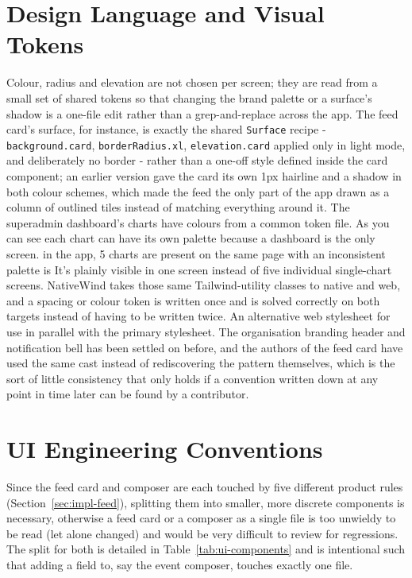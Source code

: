 \section{Design Language and Visual Tokens}
\label{sec:impl-design-tokens}
Colour, radius and elevation are not chosen per screen; they are read from a small set of shared tokens so that changing the brand palette or a surface's shadow is a one-file edit rather than a grep-and-replace across the app. The feed card's surface, for instance, is exactly the shared \texttt{Surface} recipe - \texttt{background.card}, \texttt{borderRadius.xl}, \texttt{elevation.card} applied only in light mode, and deliberately no border - rather than a one-off style defined inside the card component; an earlier version gave the card its own 1px hairline and a shadow in both colour schemes, which made the feed the only part of the app drawn as a column of outlined tiles instead of matching everything around it. The superadmin dashboard's charts have colours from a common token file. As you can see each chart can have its own palette because a dashboard is the only screen. in the app, 5 charts are present on the same page with an inconsistent palette is It's plainly visible in one screen instead of five individual single-chart screens. NativeWind takes those same Tailwind-utility classes to native and web, and a spacing or colour token is written once and is solved correctly on both targets instead of having to be written twice. An alternative web stylesheet for use in parallel with the primary stylesheet. The organisation branding header and notification bell has been settled on before, and the authors of the feed card have used the same cast instead of rediscovering the pattern themselves, which is the sort of little consistency that only holds if a convention written down at any point in time later can be found by a contributor.

\section{UI Engineering Conventions}
\label{sec:impl-ui-conventions}
Since the feed card and composer are each touched by five different product rules (Section~\ref{sec:impl-feed}), splitting them into smaller, more discrete components is necessary, otherwise a feed card or a composer as a single file is too unwieldy to be read (let alone changed) and would be very difficult to review for regressions. The split for both is detailed in Table~\ref{tab:ui-components} and is intentional such that adding a field to, say the event composer, touches exactly one file.

